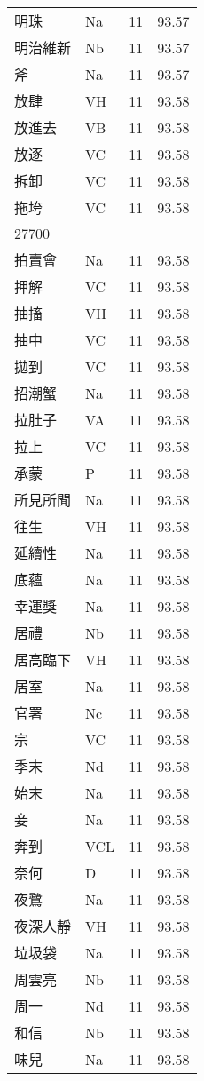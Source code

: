 \documentclass[twocolumn]{book}
\begin{document}
\begin{supertabular}{llrr}
明珠 & Na & 11 &  93.57\\
明治維新 & Nb & 11 &  93.57\\
斧 & Na & 11 &  93.57\\
放肆 & VH & 11 &  93.58\\
放進去 & VB & 11 &  93.58\\
放逐 & VC & 11 &  93.58\\
拆卸 & VC & 11 &  93.58\\
拖垮 & VC & 11 &  93.58\\
27700\\
拍賣會 & Na & 11 &  93.58\\
押解 & VC & 11 &  93.58\\
抽搐 & VH & 11 &  93.58\\
抽中 & VC & 11 &  93.58\\
拋到 & VC & 11 &  93.58\\
招潮蟹 & Na & 11 &  93.58\\
拉肚子 & VA & 11 &  93.58\\
拉上 & VC & 11 &  93.58\\
承蒙 & P & 11 &  93.58\\
所見所聞 & Na & 11 &  93.58\\
往生 & VH & 11 &  93.58\\
延續性 & Na & 11 &  93.58\\
底蘊 & Na & 11 &  93.58\\
幸運獎 & Na & 11 &  93.58\\
居禮 & Nb & 11 &  93.58\\
居高臨下 & VH & 11 &  93.58\\
居室 & Na & 11 &  93.58\\
官署 & Nc & 11 &  93.58\\
宗 & VC & 11 &  93.58\\
季末 & Nd & 11 &  93.58\\
始末 & Na & 11 &  93.58\\
妾 & Na & 11 &  93.58\\
奔到 & VCL & 11 &  93.58\\
奈何 & D & 11 &  93.58\\
夜鷺 & Na & 11 &  93.58\\
夜深人靜 & VH & 11 &  93.58\\
垃圾袋 & Na & 11 &  93.58\\
周雲亮 & Nb & 11 &  93.58\\
周一 & Nd & 11 &  93.58\\
和信 & Nb & 11 &  93.58\\
味兒 & Na & 11 &  93.58\\

\end{supertabular}
\end{document}
